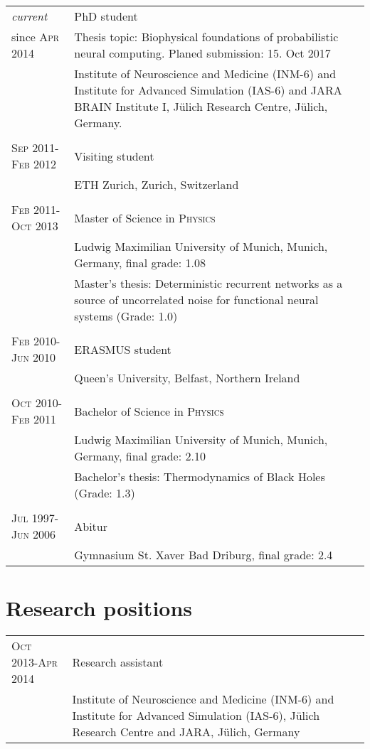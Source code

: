 \documentclass[a4paper,10pt]{article}
\begin{document}
\begin{longtable}{>{\hfill}p{3.15cm}|p{10.4cm}}
  \emph{current} & PhD student \\
  since \textsc{Apr 2014}& \footnotesize Thesis topic: Biophysical foundations of probabilistic neural computing. Planed submission: 15. Oct 2017 \\
  & \footnotesize Institute of Neuroscience and Medicine (INM-6) and Institute for Advanced Simulation (IAS-6) and JARA BRAIN Institute I, J\"ulich Research Centre, J\"ulich, Germany. \\
  \multicolumn{2}{c}{} \\
  \textsc{Sep} 2011-\textsc{Feb} 2012 & Visiting student \\
  & \footnotesize{ETH Zurich, Zurich, Switzerland} \\
  \multicolumn{2}{c}{} \\
  \textsc{Feb} 2011-\textsc{Oct} 2013 & Master of Science in \textsc{Physics} \\
  & \footnotesize Ludwig Maximilian University of Munich, Munich, Germany, final grade: 1.08 \\
  & \footnotesize Master's thesis: Deterministic recurrent networks as
  a source of uncorrelated noise for
  functional neural systems (Grade: 1.0) \\
  \multicolumn{2}{c}{} \\
  \textsc{Feb} 2010-\textsc{Jun} 2010 & ERASMUS student \\
  & \footnotesize Queen's University, Belfast, Northern Ireland \\
  \multicolumn{2}{c}{} \\
  \textsc{Oct} 2010-\textsc{Feb} 2011 & Bachelor of Science in \textsc{Physics} \\
  & \footnotesize Ludwig Maximilian University of Munich, Munich, Germany, final grade: 2.10 \\
  & \footnotesize Bachelor's thesis: Thermodynamics of Black Holes (Grade: 1.3) \\
  \multicolumn{2}{c}{} \\
  \textsc{Jul} 1997-\textsc{Jun} 2006 & Abitur \\
  & \footnotesize Gymnasium St. Xaver Bad Driburg, final grade: 2.4
\end{longtable}

\section{Research positions}
\begin{longtable}{>{\hfill}p{3.15cm}|p{10.4cm}}
\textsc{Oct} 2013-\textsc{Apr} 2014 & Research assistant \\
& \footnotesize Institute of Neuroscience and Medicine (INM-6) and Institute for Advanced Simulation (IAS-6), J\"ulich Research Centre and JARA, J\"ulich, Germany\\
\end{longtable}
\end{document}
